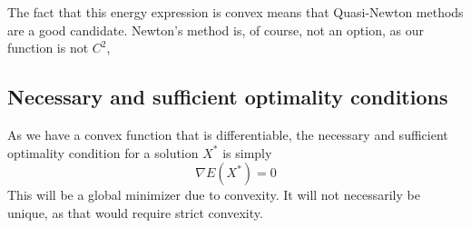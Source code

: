 The fact that this energy expression is convex means that Quasi-Newton methods are a good candidate. Newton's method is, of course, not an option, as our function is not $C^2$,

\subsection{Necessary and sufficient optimality conditions}
As we have a convex function that is differentiable, the necessary and sufficient optimality condition for a solution $X^*$ is simply \begin{equation}
    \nabla E(X^*) = 0
\end{equation}
This will be a global minimizer due to convexity. It will not necessarily be unique, as that would require strict convexity.








